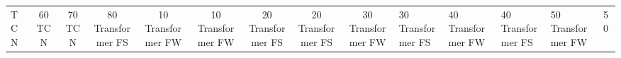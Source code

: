 \begin{table}
\begin{tabular}{|l|c|c|c|c|c|c|c|c|}
TCN & 60%
TCN & 70%
TCN & 80%
Transformer FS & 10%
Transformer FW & 10%
Transformer FW & 20%
Transformer FS & 20%
Transformer FS & 30%
Transformer FW & 30%
Transformer FS & 40%
Transformer FW & 40%
Transformer FS & 50%
Transformer FW & 50%

\end{tabular}
\end{table}
